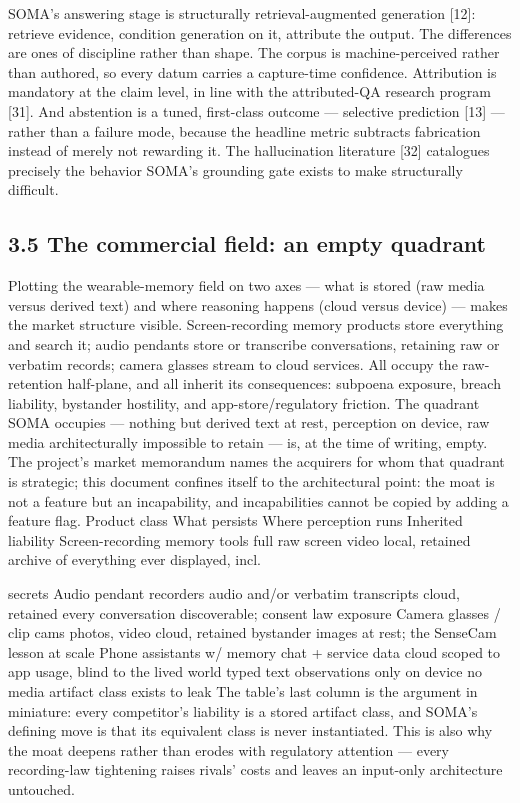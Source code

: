 SOMA's answering stage is structurally retrieval-augmented generation {[}12{]}: retrieve evidence, condition generation on it, attribute the output. The differences are ones of discipline rather than shape. The corpus is machine-perceived rather than authored, so every datum carries a capture-time confidence. Attribution is mandatory at the claim level, in line with the attributed-QA research program {[}31{]}. And abstention is a tuned, first-class outcome --- selective prediction {[}13{]} --- rather than a failure mode, because the headline metric subtracts fabrication instead of merely not rewarding it. The hallucination literature {[}32{]} catalogues precisely the behavior SOMA's grounding gate exists to make structurally difficult.

\subsection{3.5 The commercial field: an empty quadrant}\label{the-commercial-field-an-empty-quadrant}

Plotting the wearable-memory field on two axes --- what is stored (raw media versus derived text) and where reasoning happens (cloud versus device) --- makes the market structure visible. Screen-recording memory products store everything and search it; audio pendants store or transcribe conversations, retaining raw or verbatim records; camera glasses stream to cloud services. All occupy the raw-retention half-plane, and all inherit its consequences: subpoena exposure, breach liability, bystander hostility, and app-store/regulatory friction. The quadrant SOMA occupies --- nothing but derived text at rest, perception on device, raw media architecturally impossible to retain --- is, at the time of writing, empty. The project's market memorandum names the acquirers for whom that quadrant is strategic; this document confines itself to the architectural point: the moat is not a feature but an incapability, and incapabilities cannot be copied by adding a feature flag. Product class What persists Where perception runs Inherited liability Screen-recording memory tools full raw screen video local, retained archive of everything ever displayed, incl.

secrets Audio pendant recorders audio and/or verbatim transcripts cloud, retained every conversation discoverable; consent law exposure Camera glasses / clip cams photos, video cloud, retained bystander images at rest; the SenseCam lesson at scale Phone assistants w/ memory chat + service data cloud scoped to app usage, blind to the lived world typed text observations only on device no media artifact class exists to leak The table's last column is the argument in miniature: every competitor's liability is a stored artifact class, and SOMA's defining move is that its equivalent class is never instantiated. This is also why the moat deepens rather than erodes with regulatory attention --- every recording-law tightening raises rivals' costs and leaves an input-only architecture untouched.

